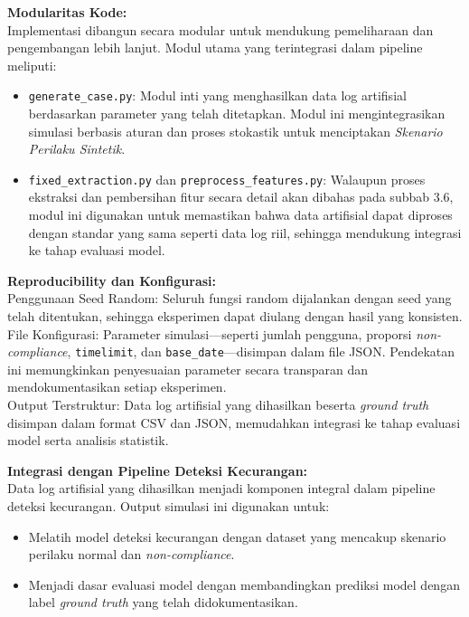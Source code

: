\textbf{Modularitas Kode:} \\
Implementasi dibangun secara modular untuk mendukung pemeliharaan dan pengembangan lebih lanjut. Modul utama yang terintegrasi dalam pipeline meliputi:
\begin{itemize}
    \item \texttt{generate\_case.py}: Modul inti yang menghasilkan data log artifisial berdasarkan parameter yang telah ditetapkan. Modul ini mengintegrasikan simulasi berbasis aturan dan proses stokastik untuk menciptakan \textit{Skenario Perilaku Sintetik}.
    \item \texttt{fixed\_extraction.py} dan \texttt{preprocess\_features.py}: Walaupun proses ekstraksi dan pembersihan fitur secara detail akan dibahas pada subbab 3.6, modul ini digunakan untuk memastikan bahwa data artifisial dapat diproses dengan standar yang sama seperti data log riil, sehingga mendukung integrasi ke tahap evaluasi model.
\end{itemize}

\textbf{Reproducibility dan Konfigurasi:} \\
Penggunaan Seed Random: Seluruh fungsi random dijalankan dengan seed yang telah ditentukan, sehingga eksperimen dapat diulang dengan hasil yang konsisten. \\
File Konfigurasi: Parameter simulasi---seperti jumlah pengguna, proporsi \textit{non-compliance}, \texttt{timelimit}, dan \texttt{base\_date}---disimpan dalam file JSON. Pendekatan ini memungkinkan penyesuaian parameter secara transparan dan mendokumentasikan setiap eksperimen. \\
Output Terstruktur: Data log artifisial yang dihasilkan beserta \textit{ground truth} disimpan dalam format CSV dan JSON, memudahkan integrasi ke tahap evaluasi model serta analisis statistik.

\textbf{Integrasi dengan Pipeline Deteksi Kecurangan:} \\
Data log artifisial yang dihasilkan menjadi komponen integral dalam pipeline deteksi kecurangan. Output simulasi ini digunakan untuk:
\begin{itemize}
    \item Melatih model deteksi kecurangan dengan dataset yang mencakup skenario perilaku normal dan \textit{non-compliance}.
    \item Menjadi dasar evaluasi model dengan membandingkan prediksi model dengan label \textit{ground truth} yang telah didokumentasikan.
\end{itemize}


